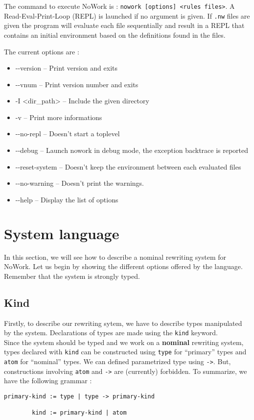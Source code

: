 \documentclass[12pt,a4paper]{article}
\begin{document}
The command to execute NoWork is : \texttt{nowork [options] <rules
  files>}.  A Read-Eval-Print-Loop (REPL) is launched if no argument
is given. If \texttt{.nw} files are given the program will evaluate
each file sequentially and result in a REPL that contains an initial
environment based on the definitions found in the files.

The current options are :
\begin{itemize}
\item -{}-version -- Print version and exits
\item -{}-vnum -- Print version number and exits
\item -I <dir\_path> -- Include the given directory
\item -v -- Print more informations
\item -{}-no-repl -- Doesn't start a toplevel
\item -{}-debug -- Launch nowork in debug mode, the exception backtrace is reported
\item -{}-reset-system -- Doesn't keep the environment between each evaluated files
\item -{}-no-warning -- Doesn't print the warnings.
\item -{}-help -- Display the list of options
\end{itemize}

\section{System language}
In this section, we will see how to describe a nominal rewriting
system for NoWork. Let us begin by showing the different options
offered by the language. Remember that the system is strongly typed.


\subsection{Kind}
Firstly, to describe our rewriting sytem, we have to describe types
manipulated by the system. Declarations of types are made using the
\verb?kind? keyword.\\
Since the system should be typed and we work on a \textbf{nominal}
rewriting system, types declared with \verb?kind? can be constructed using
\verb?type? for ``primary'' types and \verb?atom? for ``nominal''
types. We can defined parametrized type using \verb?->?. But,
constructions involving \verb?atom? and \verb?->? are (currently) forbidden.
To summarize, we have the following grammar :
\begin{verbatim}
primary-kind := type | type -> primary-kind

        kind := primary-kind | atom
\end{verbatim}
\end{document}
